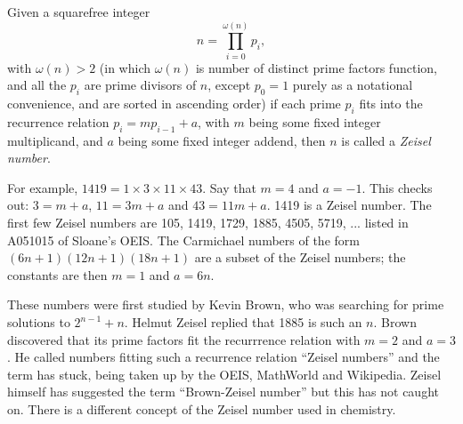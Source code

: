 \documentclass[12pt]{article}
\begin{document}
Given a squarefree integer $$n = \prod_{i = 0}^{\omega(n)} p_i,$$ with $\omega(n) > 2$ (in which $\omega(n)$ is number of distinct prime factors function, and all the $p_i$ are prime divisors of $n$, except $p_0 = 1$ purely as a notational convenience, and are sorted in ascending order) if each prime $p_i$ fits into the recurrence relation $p_i = mp_{i - 1} + a$, with $m$ being some fixed integer multiplicand, and $a$ being some fixed integer addend, then $n$ is called a {\em Zeisel number}.

For example, $1419 = 1 \times 3 \times 11 \times 43$. Say that $m = 4$ and $a = -1$. This checks out: $3 = m + a$, $11 = 3m + a$ and $43 = 11m + a$. 1419 is a Zeisel number. The first few Zeisel numbers are 105, 1419, 1729, 1885, 4505, 5719, ... listed in A051015 of Sloane's OEIS. The Carmichael numbers of the form $(6n + 1)(12n + 1)(18n + 1)$ are a subset of the Zeisel numbers; the constants are then $m = 1$ and $a = 6n$.

These numbers were first studied by Kevin Brown, who was searching for prime solutions to $2^{n - 1} + n$. Helmut Zeisel replied that 1885 is such an $n$. Brown discovered that its prime factors fit the recurrrence relation with $m = 2$ and $a = 3$. He called numbers fitting such a recurrence relation ``Zeisel numbers'' and the term has stuck, being taken up by the OEIS, MathWorld and Wikipedia. Zeisel himself has suggested the term ``Brown-Zeisel number'' but this has not caught on. There is a different concept of the Zeisel number used in chemistry.
\end{document}
